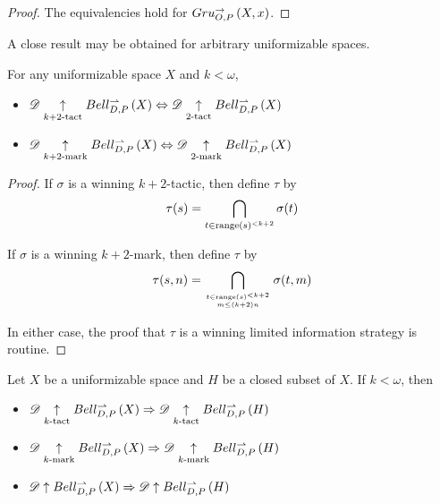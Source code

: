 \begin{proof}
  The equivalencies hold for $Gru_{O,P}^{\to}\left({X},{x}\right)$.
\end{proof}

A close result may be obtained for arbitrary uniformizable spaces.

\begin{prop} For any uniformizable space $X$ and $k<\omega$,
  \begin{itemize}
    \item
      $
        \mathscr{D}\underset{k+2\text{-tact}}{\uparrow}Bell_{D,P}^{\rightharpoonup}\left({X}\right)
          \Leftrightarrow
        \mathscr{D}\underset{2\text{-tact}}{\uparrow}Bell_{D,P}^{\rightharpoonup}\left({X}\right)
      $
    \item
      $
        \mathscr{D}\underset{k+2\text{-mark}}{\uparrow}Bell_{D,P}^{\rightharpoonup}\left({X}\right)
          \Leftrightarrow
        \mathscr{D}\underset{2\text{-mark}}{\uparrow}Bell_{D,P}^{\rightharpoonup}\left({X}\right)
      $
  \end{itemize}
\end{prop}

\begin{proof}
  If $\sigma$ is a winning $k+2$-tactic, then define $\tau$ by
    \[
      \tau (s)
        =
      \bigcap_{t\in \text{range}(s)^{<k+2}}
      \sigma(t)
    \]

  If $\sigma$ is a winning $k+2$-mark, then define $\tau$ by
    \[
      \tau (s,n)
        =
      \bigcap_{t\in \text{range}(s)^{<k+2} \atop {m\leq(k+2)n}}
      \sigma(t,m)
    \]

  In either case, the proof that $\tau$ is a winning limited information
  strategy is routine.
\end{proof}


\begin{thm}
  Let $X$ be a uniformizable space and $H$ be a closed subset of $X$.
  If $k<\omega$, then
  \begin{itemize}
    \item
      $
        \mathscr{D} \underset{k\text{-tact}}{\uparrow} Bell_{D,P}^{\rightharpoonup}\left({X}\right)
          \Rightarrow
        \mathscr{D} \underset{k\text{-tact}}{\uparrow} Bell_{D,P}^{\rightharpoonup}\left({H}\right)
      $
    \item
      $
        \mathscr{D} \underset{k\text{-mark}}{\uparrow} Bell_{D,P}^{\rightharpoonup}\left({X}\right)
          \Rightarrow
        \mathscr{D} \underset{k\text{-mark}}{\uparrow} Bell_{D,P}^{\rightharpoonup}\left({H}\right)
      $
    \item
      $
        \mathscr{D} \uparrow Bell_{D,P}^{\rightharpoonup}\left({X}\right)
          \Rightarrow
        \mathscr{D} \uparrow Bell_{D,P}^{\rightharpoonup}\left({H}\right)
      $
  \end{itemize}
\end{thm}

